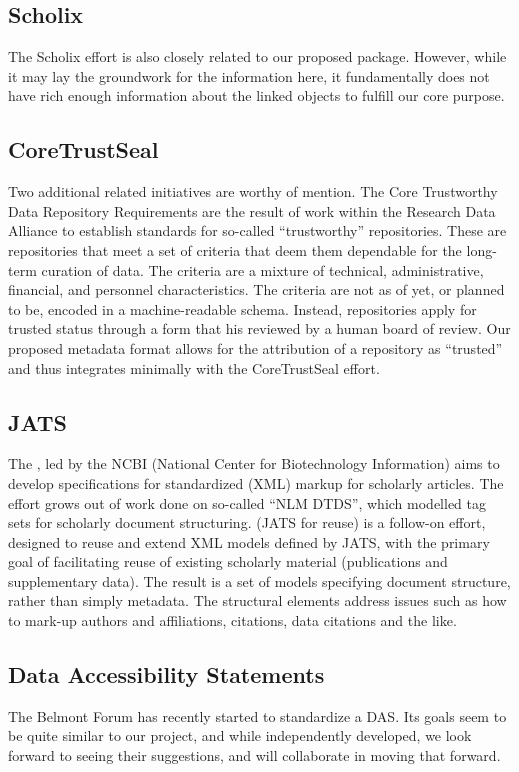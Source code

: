 \subsection{Scholix}
The Scholix effort \parencite{BurtonScholixMetadataSchema2017} is also closely related to our proposed package. However, while it may lay the groundwork for the information here, it fundamentally does not have rich enough information about the linked objects to fulfill our core purpose.

\subsection{CoreTrustSeal}
Two additional related initiatives are worthy of mention.   The Core Trustworthy Data Repository Requirements \parencite{CoreTrustSealDataRepositoriesRequirements2017} are the result of work within the Research Data Alliance to establish standards for so-called ``trustworthy'' repositories.  These are repositories that meet a set of criteria that deem them dependable for the long-term curation of data.  The criteria are a mixture of technical, administrative, financial, and personnel characteristics.  The criteria are not as of yet, or planned to be, encoded in a machine-readable schema.  Instead, repositories apply for trusted status through a form that his reviewed by a human board of review.  Our proposed metadata format allows for the attribution of a repository as ``trusted'' and thus integrates minimally with the CoreTrustSeal effort.

\subsection{JATS}
The , led by the NCBI (National Center for Biotechnology Information) aims to develop specifications for standardized (XML) markup for scholarly articles.  The effort grows out of work done on so-called ``NLM DTDS'', which modelled tag sets for scholarly document structuring.   (JATS for reuse) is a follow-on effort, designed to reuse and extend XML models defined by JATS, with the primary goal of facilitating reuse of existing scholarly material (publications and supplementary data). The result is a set of models specifying document structure, rather than simply metadata.  The structural elements address issues such as how to mark-up authors and affiliations, citations, data citations and the like.

\subsection{Data Accessibility Statements}
The Belmont Forum has recently started  to standardize a \ac{DAS}. Its goals seem to be quite similar to our project, and while independently developed, we look forward to seeing their suggestions, and will collaborate in moving that forward.
